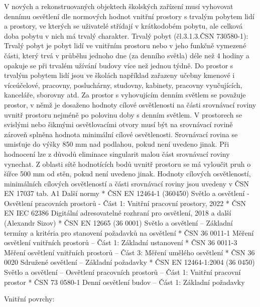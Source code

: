 V nových a rekonstruovaných objektech školských zařízení musí vyhovovat dennímu osvětlení dle normových hodnot vnitřní prostory s trvalým pobytem lidí a prostory, ve kterých se uživatelé střídají v krátkodobém pobytu, ale celková doba pobytu v nich má trvalý charakter.
Trvalý pobyt (čl.3.1.3.ČSN 730580-1):
\medskip
Trvalý pobyt je pobyt lidí ve vnitřním prostoru nebo v jeho funkčně vymezené části, který trvá v průběhu jednoho dne (za denního světla) déle než 4 hodiny a opakuje se při trvalém užívání budovy více než jednou týdně.
\medskip
Do prostor s trvalým pobytem lidí jsou ve školách například zařazeny učebny kmenové i víceúčelové, pracovny, posluchárny, studovny, kabinety, pracovny vyučujících, kanceláře, sborovny atd. Za prostor s vyhovujícím denním světlem se považuje prostor, v němž je dosaženo hodnoty cílové osvětlenosti na části srovnávací roviny uvnitř prostoru nejméně po polovinu doby s denním světlem.
\medskip
V prostorech se svislými nebo šikmými osvětlovacími otvory musí být na srovnávací rovině zároveň splněna hodnota minimální cílové osvětlenosti.
\medskip
Srovnávací rovina se umisťuje do výšky 850 mm nad podlahou, pokud není uvedeno jinak. Při hodnocení lze z důvodů eliminace singularit malou část srovnávací roviny vynechat. Z oblasti sítě hodnotících bodů uvnitř prostoru se má vyloučit pruh o šířce 500 mm od stěn, pokud není uvedeno jinak.
\medskip
Hodnoty cílových osvětleností, minimálních cílových osvětleností a části srovnávací roviny jsou uvedeny v ČSN EN 17037 tab. A1
\medskip
{\sbf Další normy}
\begitems
    * ČSN EN 12464-1 (360450) Světlo a osvětlení - Osvětlení pracovních prostorů - Část 1: Vnitřní pracovní prostory, 2022
    * ČSN EN IEC 62386 Digitální adresovatelné rozhraní pro osvětlení, 2018
      a další (Alexandr Sizov)
    * ČSN EN 12665 (36 0001) Světlo a osvětlení – Základní termíny a kritéria pro stanovení požadavků na osvětlení
    * ČSN 36 0011-1 Měření osvětlení vnitřních prostorů – Část 1: Základní ustanovení
    * ČSN 36 0011-3 Měření osvětlení vnitřních prostorů – Část 3: Měření umělého osvětlení
    * ČSN 36 0020 Sdružené osvětlení – Základní požadavky
    * ČSN EN 12464-1:2004 (36 0450) Světlo a osvětlení – Osvětlení pracovních prostorů – Část 1: Vnitřní pracovní prostor
    * ČSN 73 0580-1 Denní osvětlení budov – Část 1: Základní požadavky
\enditems

{\sbf Vnitřní povrchy:}

